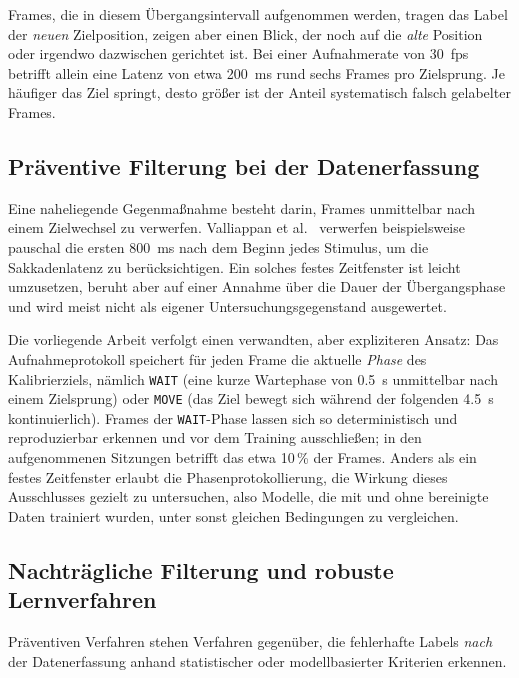 \documentclass[
  11pt,
  a4paper,
  oneside,
  DIV=12,                 %
  BCOR=8mm,               %
  parskip=half,           %
  headings=normal,
  bibliography=totoc,     %
  listof=totoc            %
]{scrreprt}
\newcommand{\code}[1]{\texttt{#1}}
\begin{document}
Frames, die in diesem Übergangsintervall aufgenommen werden, tragen das Label der \emph{neuen} Zielposition, zeigen aber einen Blick, der noch auf die \emph{alte} Position oder irgendwo dazwischen gerichtet ist. Bei einer Aufnahmerate von \SI{30}{fps} betrifft allein eine Latenz von etwa \SI{200}{\milli\second} rund sechs Frames pro Zielsprung. Je häufiger das Ziel springt, desto größer ist der Anteil systematisch falsch gelabelter Frames.

\subsection{Präventive Filterung bei der Datenerfassung}
\label{subsec:phase_logging}
Eine naheliegende Gegenmaßnahme besteht darin, Frames unmittelbar nach einem Zielwechsel zu verwerfen. Valliappan et al.~\cite{valliappan2020smartphone} verwerfen beispielsweise pauschal die ersten \SI{800}{\milli\second} nach dem Beginn jedes Stimulus, um die Sakkadenlatenz zu berücksichtigen. Ein solches festes Zeitfenster ist leicht umzusetzen, beruht aber auf einer Annahme über die Dauer der Übergangsphase und wird meist nicht als eigener Untersuchungsgegenstand ausgewertet.

Die vorliegende Arbeit verfolgt einen verwandten, aber expliziteren Ansatz: Das Aufnahmeprotokoll speichert für jeden Frame die aktuelle \emph{Phase} des Kalibrierziels, nämlich \code{WAIT} (eine kurze Wartephase von \SI{0,5}{\second} unmittelbar nach einem Zielsprung) oder \code{MOVE} (das Ziel bewegt sich während der folgenden \SI{4,5}{\second} kontinuierlich). Frames der \code{WAIT}-Phase lassen sich so deterministisch und reproduzierbar erkennen und vor dem Training ausschließen; in den aufgenommenen Sitzungen betrifft das etwa 10\,\% der Frames. Anders als ein festes Zeitfenster erlaubt die Phasenprotokollierung, die Wirkung dieses Ausschlusses gezielt zu untersuchen, also Modelle, die mit und ohne bereinigte Daten trainiert wurden, unter sonst gleichen Bedingungen zu vergleichen.

\subsection{Nachträgliche Filterung und robuste Lernverfahren}
\label{subsec:dmrf}
Präventiven Verfahren stehen Verfahren gegenüber, die fehlerhafte Labels \emph{nach} der Datenerfassung anhand statistischer oder modellbasierter Kriterien erkennen.
\end{document}
